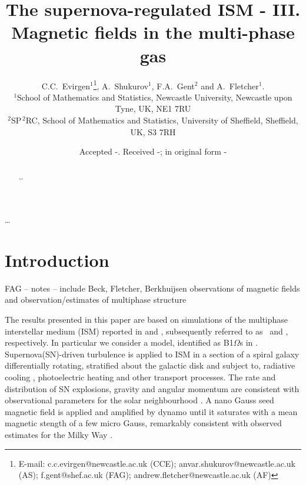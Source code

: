 \documentclass[useAMS,usenatbib]{mn2e}
\title[The supernova-regulated ISM - III. Magnetic fields in the multi-phase gas]{The supernova-regulated ISM - III. Magnetic fields in the multi-phase gas}
\author[C. C.~Evirgen, A.~Shukurov, F.A. Gent and A.~Fletcher]{C.C.~Evirgen$^{1}$\thanks{E-mail:
c.c.evirgen@newcastle.ac.uk (CCE); anvar.shukurov@newcastle.ac.uk (AS); 
f.gent@shef.ac.uk (FAG); andrew.fletcher@newcastle.ac.uk (AF)}, A.~Shukurov$^{1}$, F.A.~Gent$^{2}$ and A.~Fletcher$^{1}$.\\%
$^{1}$School of Mathematics and Statistics, Newcastle University,
Newcastle upon Tyne, UK, NE1 7RU\\
$^{2}$SP$^{\,2}$\!RC, School of Mathematics and Statistics, University of Sheffield, 
Sheffield, UK, S3 7RH}
\begin{document}
\newcommand{\bvec}[1]{\boldsymbol{#1}}
\newcommand{\avg}[1]{\left<\bvec{#1}\right>_{l}}
\date{Accepted -. Received -; in original form -}

\pagerange{\pageref{firstpage}--\pageref{lastpage}} 

\maketitle

\label{firstpage}

\begin{abstract}
\ldots 
\end{abstract}

\begin{keywords}
\ldots
\end{keywords}

\section{Introduction}

FAG -- notes -- include Beck, Fletcher, Berkhuijsen observations of magnetic 
fields \citep{2013AN....334..548B, MNR18065} and observation/estimates of multiphase structure 
\citep{CS74,MO77}

The results presented in this paper are based on simulations of the multiphase 
interstellar medium (ISM) reported in \citet{GSFSM13} and \citet{GSSFM13}, %
subsequently referred to as \HD\, and \MHD, respectively.
In particular we consider a model, identified as B1$\Omega$s in \MHD.
Supernova(SN)-driven turbulence is applied to ISM in a section of a spiral
galaxy differentially rotating, stratified about the galactic disk and subject
to, radiative cooling \citep{Sarazin87,Wolfire95}, photoelectric heating
\citep{Wolfire95} and other transport processes.
The rate and distribution of SN explosions, gravity \citep{Kuijken89} and 
angular momentum are consistent with observational parameters for the solar
neighbourhood \citep{F01}.
A nano Gauss seed magnetic field is applied and amplified by dynamo until it
saturates with a mean magnetic stength of a few micro Gauss, remarkably 
consistent with observed estimates for the Milky Way \citep{dummy}.
\end{document}
